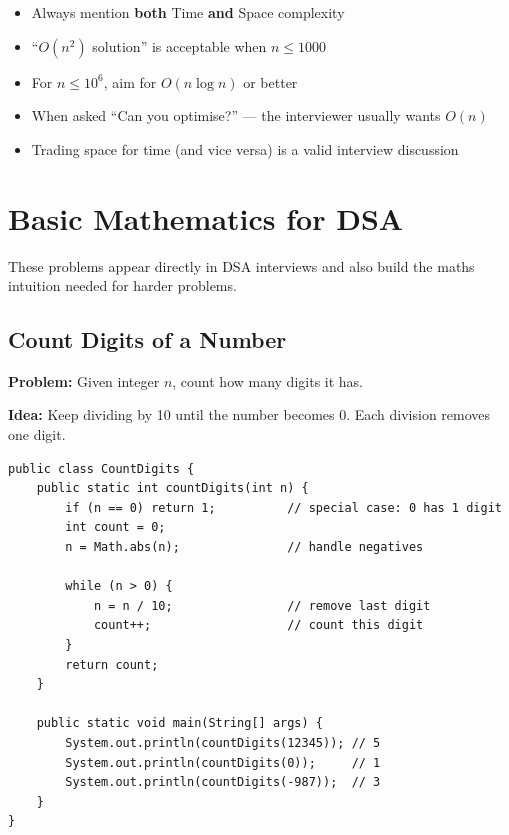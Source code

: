 \documentclass[12pt,a4paper,oneside]{book}
\begin{document}
\begin{interviewcorner}
\begin{itemize}
  \item Always mention \textbf{both} Time \textbf{and} Space complexity
  \item ``$O(n^2)$ solution'' is acceptable when $n \leq 1000$
  \item For $n \leq 10^6$, aim for $O(n \log n)$ or better
  \item When asked ``Can you optimise?'' --- the interviewer usually wants $O(n)$
  \item Trading space for time (and vice versa) is a valid interview discussion
\end{itemize}
\end{interviewcorner}

\chapter{Basic Mathematics for DSA}

These problems appear directly in DSA interviews and also build the maths intuition needed for harder problems.

\section{Count Digits of a Number}

\textbf{Problem:} Given integer $n$, count how many digits it has.

\textbf{Idea:} Keep dividing by 10 until the number becomes 0. Each division removes one digit.

\begin{lstlisting}[caption={Count Digits --- Loop method}]
public class CountDigits {
    public static int countDigits(int n) {
        if (n == 0) return 1;          // special case: 0 has 1 digit
        int count = 0;
        n = Math.abs(n);               // handle negatives

        while (n > 0) {
            n = n / 10;                // remove last digit
            count++;                   // count this digit
        }
        return count;
    }

    public static void main(String[] args) {
        System.out.println(countDigits(12345)); // 5
        System.out.println(countDigits(0));     // 1
        System.out.println(countDigits(-987));  // 3
    }
}
\end{lstlisting}
\end{document}
